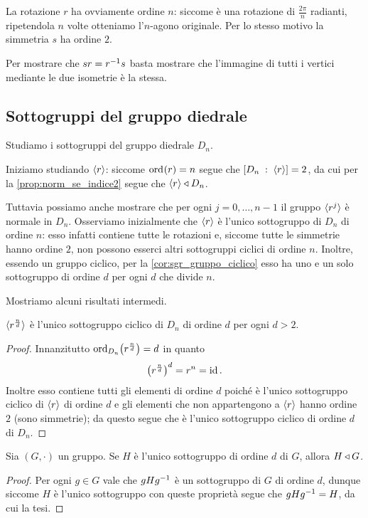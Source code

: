 La rotazione $r$ ha ovviamente ordine $n$: siccome è una rotazione di $\frac{2\pi}{n}$ radianti, ripetendola $n$ volte otteniamo l'$n$-agono originale.
Per lo stesso motivo la simmetria $s$ ha ordine $2$.

Per mostrare che $sr = r\inv s$ basta mostrare che l'immagine di tutti i vertici mediante le due isometrie è la stessa. 

\subsection{Sottogruppi del gruppo diedrale}

Studiamo i sottogruppi del gruppo diedrale $D_n$.

Iniziamo studiando $\gen r$: siccome $\ord r = n$ segue che $\grindex{D_n}{\gen r} = 2$, da cui per la \autoref{prop:norm_se_indice2} segue che $\gen r \normal D_n$.

Tuttavia possiamo anche mostrare che per ogni $j = 0, \dots, n-1$ il gruppo $\gen{r^j}$ è normale in $D_n$. Osserviamo inizialmente che $\gen r$ è l'unico sottogruppo di $D_n$ di ordine $n$: esso infatti contiene tutte le rotazioni e, siccome tutte le simmetrie hanno ordine $2$, non possono esserci altri sottogruppi ciclici di ordine $n$.
Inoltre, essendo un gruppo ciclico, per la \autoref{cor:sgr_gruppo_ciclico} esso ha uno e un solo sottogruppo di ordine $d$ per ogni $d$ che divide $n$.

Mostriamo alcuni risultati intermedi.
\begin{proposition}
    $\gen{r^{\frac{n}{d}}}$ è l'unico sottogruppo ciclico di $D_n$ di ordine $d$ per ogni $d > 2$.
\end{proposition}
\begin{proof}
    Innanzitutto $\ord[D_n]{r^{\frac{n}{d}}} = d$ in quanto \[
        \parens*{r^{\frac{n}{d}}}^d = r^n = \id.
    \] Inoltre esso contiene tutti gli elementi di ordine $d$ poiché è l'unico sottogruppo ciclico di $\gen r$ di ordine $d$ e gli elementi che non appartengono a $\gen r$ hanno ordine $2$ (sono simmetrie); da questo segue che è l'unico sottogruppo ciclico di ordine $d$ di $D_n$.
\end{proof}

\begin{proposition}
    Sia $(G, \cdot)$ un gruppo. Se $H$ è l'unico sottogruppo di ordine $d$ di $G$, allora $H \normal G$.
\end{proposition}
\begin{proof}
    Per ogni $g \in G$ vale che $gHg\inv$ è un sottogruppo di $G$ di ordine $d$, dunque siccome $H$ è l'unico sottogruppo con queste proprietà segue che $gHg\inv = H$, da cui la tesi.
\end{proof}

